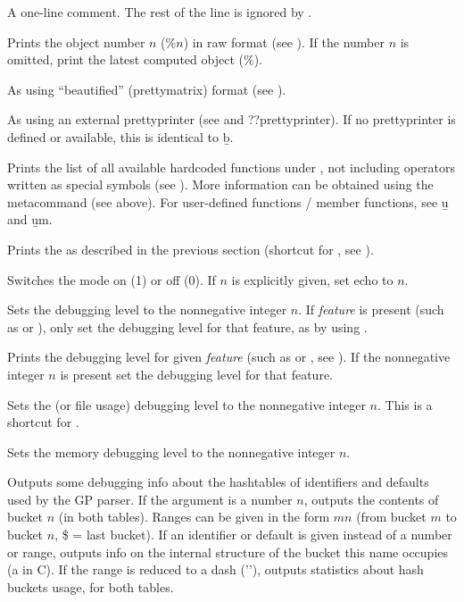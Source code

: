 \subseckbd{\bs\bs} A one-line comment. The rest of the line
is ignored by .

 Prints the object number $n$ ($\%n$)
in raw format (see ). If the number $n$ is omitted, print the
latest computed object ($\%$). \label{se:history}

 As  using ``beautified'' (prettymatrix)
format (see ).

 As  using an external prettyprinter (see
 and ??prettyprinter). If no prettyprinter is defined or
available, this is identical to \b{b}.

 Prints the list of all available
hardcoded functions under , not including operators written as special
symbols (see ). More information can be obtained using
the  metacommand (see above). For user-defined functions / member
functions, see \b{u} and \b{um}.

 Prints the  as described in the
previous section (shortcut for , see ).

 Switches the  mode on (1) or off (0). If
$n$ is explicitly given, set echo to $n$.

 Sets the debugging level  to the
nonnegative integer $n$. If \emph{feature} is present (such as  or
), only set the debugging level for that feature, as by using
.

 Prints the debugging level for given
\emph{feature} (such as  or , see ).
If the nonnegative integer $n$ is present set the debugging level for
that feature.

 Sets the  (or file usage) debugging level
to the nonnegative integer $n$. This is a shortcut
for .

 Sets the memory debugging level 
to the nonnegative integer $n$.

 Outputs some debugging info about the
hashtables of identifiers and defaults used by the GP parser. If the argument
is a number $n$, outputs the contents of bucket $n$ (in both tables). Ranges
can be given in the form $m$\kbd{-}$n$ (from bucket $m$ to bucket $n$, \$ =
last bucket). If an identifier or default is given instead of a number or range,
outputs info on the internal structure of the bucket this name occupies
(a  in C). If the range is reduced to a dash ('\kbd{-}'),
outputs statistics about hash buckets usage, for both tables.

